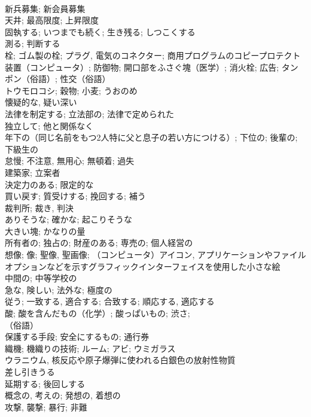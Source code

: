 \documentclass[8pt]{extreport}
\begin{document}
\begin{CJK}{UTF8}{min}
\\	新兵募集; 新会員募集	
\\	天井; 最高限度; 上昇限度	
\\	固執する; いつまでも続く; 生き残る; しつこくする	
\\	測る; 判断する	
\\	栓; ゴム製の栓; プラグ, 電気のコネクター; 商用プログラムのコピープロテクト装置（コンピュータ）; 防御物; 開口部をふさぐ塊（医学）; 消火栓; 広告; タンポン（俗語）; 性交（俗語）	
\\	トウモロコシ; 穀物; 小麦; うおのめ	
\\	懐疑的な, 疑い深い	
\\	法律を制定する; 立法部の; 法律で定められた	
\\	独立して; 他と関係なく	
\\	年下の（同じ名前をもつ2人特に父と息子の若い方につける）; 下位の; 後輩の; 下級生の	
\\	怠慢; 不注意, 無用心; 無頓着; 過失	
\\	建築家; 立案者	
\\	決定力のある; 限定的な	
\\	買い戻す; 質受けする; 挽回する; 補う	
\\	裁判所; 裁き, 判決	
\\	ありそうな; 確かな; 起こりそうな	
\\	大きい塊; かなりの量	
\\	所有者の; 独占の; 財産のある; 専売の; 個人経営の	
\\	想像; 像; 聖像, 聖画像; （コンピュータ）アイコン, アプリケーションやファイルオプションなどを示すグラフィックインターフェイスを使用した小さな絵	
\\	中間の; 中等学校の	
\\	急な, 険しい; 法外な; 極度の	
\\	従う; 一致する, 適合する; 合致する; 順応する, 適応する	
\\	酸; 酸を含んだもの（化学）; 酸っぱいもの; 渋さ; 
\\	（俗語）	
\\	保護する手段; 安全にするもの; 通行券	
\\	織機; 機織りの技術; ルーム; アビ; ウミガラス	
\\	ウラニウム, 核反応や原子爆弾に使われる白銀色の放射性物質	
\\	差し引きうる	
\\	延期する; 後回しする
\\	概念の, 考えの; 発想の, 着想の	
\\	攻撃, 襲撃; 暴行; 非難	

\end{CJK}
\end{document}
